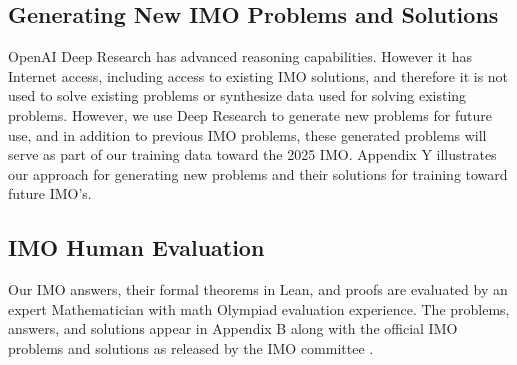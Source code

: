 \subsection{Generating New IMO Problems and Solutions}
OpenAI Deep Research \cite{deepresearch} has advanced reasoning capabilities. However it has Internet access, including access to existing IMO solutions, and therefore it is not used to solve existing problems or synthesize data used for solving existing problems. However, we use Deep Research to generate new problems for future use, and in addition to previous IMO problems, these generated problems will serve as part of our training data toward the 2025 IMO. Appendix Y illustrates our approach for generating new problems and their solutions for training toward future IMO's.

\subsection{IMO Human Evaluation}
Our IMO answers, their formal theorems in Lean, and proofs are evaluated by an expert Mathematician with math Olympiad evaluation experience. The problems, answers, and solutions appear in Appendix B along with the official IMO problems and solutions as released by the IMO committee \cite{imo2024problems_and_solutions}.